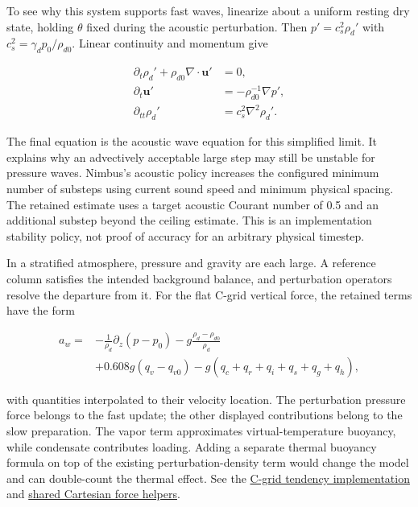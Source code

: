 \documentclass[
  11pt,
]{report}
\begin{document}
To see why this system supports fast waves, linearize about a uniform
resting dry state, holding \(\theta\) fixed during the acoustic
perturbation. Then \(p'=c_s^2\rho_d'\) with
\(c_s^2=\gamma_dp_0/\rho_{d0}\). Linear continuity and momentum give

\[\begin{aligned}
\partial_t\rho_d' + \rho_{d0}\nabla\!\cdot\boldsymbol u' &= 0, \\
\partial_t\boldsymbol u' &= -\rho_{d0}^{-1}\nabla p', \\
\partial_{tt}\rho_d' &= c_s^2\nabla^2\rho_d'.
\end{aligned}\]

The final equation is the acoustic wave equation for this simplified
limit. It explains why an advectively acceptable large step may still be
unstable for pressure waves. Nimbus's acoustic policy increases the
configured minimum number of substeps using current sound speed and
minimum physical spacing. The retained estimate uses a target acoustic
Courant number of 0.5 and an additional substep beyond the ceiling
estimate. This is an implementation stability policy, not proof of
accuracy for an arbitrary physical timestep.

In a stratified atmosphere, pressure and gravity are each large. A
reference column satisfies the intended background balance, and
perturbation operators resolve the departure from it. For the flat
C-grid vertical force, the retained terms have the form

\[\begin{aligned}
a_w ={}&-\frac{1}{\rho_d}\partial_z(p-p_0)
        -g\frac{\rho_d-\rho_{d0}}{\rho_d} \\
       &+0.608g(q_v-q_{v0})
        -g(q_c+q_r+q_i+q_s+q_g+q_h),
\end{aligned}\]

with quantities interpolated to their velocity location. The
perturbation pressure force belongs to the fast update; the other
displayed contributions belong to the slow preparation. The vapor term
approximates virtual-temperature buoyancy, while condensate contributes
loading. Adding a separate thermal buoyancy formula on top of the
existing perturbation-density term would change the model and can
double-count the thermal effect. See the
\href{../src/dynamics/schemes/klemp_wilhelmson_split/cartesian_cgrid_3d.cpp}{C-grid
tendency implementation} and
\href{../src/dynamics/schemes/klemp_wilhelmson_split/cartesian_common.hpp}{shared
Cartesian force helpers}.
\end{document}
